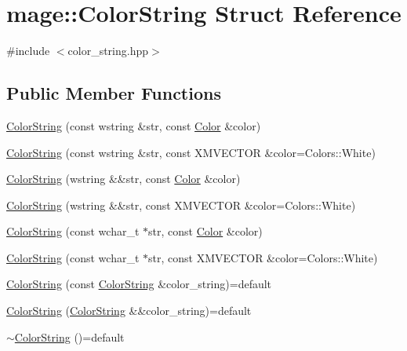 \hypertarget{structmage_1_1_color_string}{}\section{mage\+:\+:Color\+String Struct Reference}
\label{structmage_1_1_color_string}


{\ttfamily \#include $<$color\+\_\+string.\+hpp$>$}

\subsection*{Public Member Functions}
\begin{DoxyCompactItemize}
\item 
\hyperlink{structmage_1_1_color_string_a9737fbe265c4432971e715439827f25a}{Color\+String} (const wstring \&str, const \hyperlink{structmage_1_1_color}{Color} \&color)
\item 
\hyperlink{structmage_1_1_color_string_ab1f686b1ae86aedb444d02951658709d}{Color\+String} (const wstring \&str, const X\+M\+V\+E\+C\+T\+OR \&color=Colors\+::\+White)
\item 
\hyperlink{structmage_1_1_color_string_a42597e6be67ed803a79eff88de769656}{Color\+String} (wstring \&\&str, const \hyperlink{structmage_1_1_color}{Color} \&color)
\item 
\hyperlink{structmage_1_1_color_string_a0280c2fa63742358c183ee381ebc4581}{Color\+String} (wstring \&\&str, const X\+M\+V\+E\+C\+T\+OR \&color=Colors\+::\+White)
\item 
\hyperlink{structmage_1_1_color_string_aef572c89d1ed663837c6e5b1b6816984}{Color\+String} (const wchar\+\_\+t $\ast$str, const \hyperlink{structmage_1_1_color}{Color} \&color)
\item 
\hyperlink{structmage_1_1_color_string_a1a7826048fbe997d789fbae4ae97d35d}{Color\+String} (const wchar\+\_\+t $\ast$str, const X\+M\+V\+E\+C\+T\+OR \&color=Colors\+::\+White)
\item 
\hyperlink{structmage_1_1_color_string_aa878fda012b4149f673e905f6a8ea8b0}{Color\+String} (const \hyperlink{structmage_1_1_color_string}{Color\+String} \&color\+\_\+string)=default
\item 
\hyperlink{structmage_1_1_color_string_a68d8411da4dd7122975223e25bbcbb9a}{Color\+String} (\hyperlink{structmage_1_1_color_string}{Color\+String} \&\&color\+\_\+string)=default
\item 
\hyperlink{structmage_1_1_color_string_a95886010269c8c4bc3a27fbfe829f4c2}{$\sim$\+Color\+String} ()=default

\end{DoxyCompactItemize}
